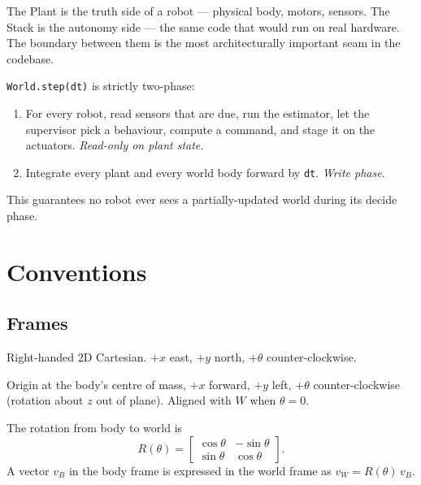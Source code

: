 \documentclass[11pt,a4paper]{article}
\newcommand{\code}[1]{\texttt{\small #1}}
\newcommand{\Rmat}[1]{R(#1)}
\begin{document}
The Plant is the truth side of a robot --- physical body, motors, sensors.
The Stack is the autonomy side --- the same code that would run on real
hardware. The boundary between them is the most architecturally important
seam in the codebase.

\code{World.step(dt)} is strictly two-phase:
\begin{enumerate}
    \item For every robot, read sensors that are due, run the estimator,
        let the supervisor pick a behaviour, compute a command, and stage
        it on the actuators. \emph{Read-only on plant state.}
    \item Integrate every plant and every world body forward by \code{dt}.
        \emph{Write phase.}
\end{enumerate}
This guarantees no robot ever sees a partially-updated world during its
decide phase.

\section{Conventions}

\subsection{Frames}

\begin{description}[leftmargin=1.5em, style=nextline]
    \item[World frame $W$.] Right-handed 2D Cartesian. $+x$ east, $+y$
        north, $+\theta$ counter-clockwise.
    \item[Body frame $B$.] Origin at the body's centre of mass, $+x$
        forward, $+y$ left, $+\theta$ counter-clockwise (rotation about $z$
        out of plane). Aligned with $W$ when $\theta = 0$.
\end{description}

The rotation from body to world is
\begin{equation}
    \Rmat{\theta} =
    \begin{bmatrix} \cos\theta & -\sin\theta \\ \sin\theta & \cos\theta \end{bmatrix}.
    \label{eq:rot}
\end{equation}
A vector $v_B$ in the body frame is expressed in the world frame as
$v_W = \Rmat{\theta}\, v_B$.
\end{document}

